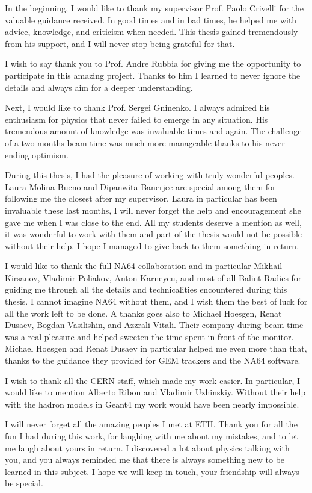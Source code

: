 In the beginning, I would like to thank my supervisor Prof. Paolo Crivelli for the valuable guidance received. In good times and in bad times, he helped me with advice, knowledge, and criticism when needed. This thesis gained tremendously from his support, and I will never stop being grateful for that. 

I wish to say thank you to Prof. Andre Rubbia for giving me the opportunity to participate in this amazing project. Thanks to him I learned to never ignore the details and always aim for a deeper understanding.

Next, I would like to thank Prof. Sergei Gninenko. I always admired his enthusiasm for physics that never failed to emerge in any situation. His tremendous amount of knowledge was invaluable times and again. The challenge of a two months beam time was much more manageable thanks to his never-ending optimism.

During this thesis, I had the pleasure of working with truly wonderful peoples. Laura Molina Bueno and Dipanwita Banerjee are special among them for following me the closest after my supervisor. Laura in particular has been invaluable these last months, I will never forget the help and encouragement she gave me when I was close to the end. All my students deserve a mention as well, it was wonderful to work with them and part of the thesis would not be possible without their help. I hope I managed to give back to them something in return.

I would like to thank the full NA64 collaboration and in particular Mikhail Kirsanov, Vladimir Poliakov, Anton Karneyeu, and most of all Balint Radics for guiding me through all the details and technicalities encountered during this thesis. I cannot imagine NA64 without them, and I wish them the best of luck for all the work left to be done. A thanks goes also to Michael Hoesgen, Renat Dusaev, Bogdan Vasilishin, and Azzrali Vitali. Their company during beam time was a real pleasure and helped sweeten the time spent in front of the monitor. Michael Hoesgen and Renat Dusaev in particular helped me even more than that, thanks to the guidance they provided for GEM trackers and the NA64 software.

I wish to thank all the CERN staff, which made my work easier. In particular, I would like to mention Alberto Ribon and Vladimir Uzhinskiy. Without their help with the hadron models in Geant4 my work would have been nearly impossible.

I will never forget all the amazing peoples I met at ETH. Thank you for all the fun I had during this work, for laughing with me about my mistakes, and to let me laugh about yours in return. I discovered a lot about physics talking with you, and you always reminded me that there is always something new to be learned in this subject. I hope we will keep in touch, your friendship will always be special.

